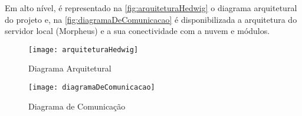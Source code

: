 Em alto nível, é representado na \autoref{fig:arquiteturaHedwig} o diagrama arquitetural do projeto e, na \autoref{fig:diagramaDeComunicacao} é disponibilizada a arquitetura do servidor local (Morpheus) e a sua conectividade com a nuvem e módulos.

\begin{figure}[htb]
	\caption{\label{fig:arquiteturaHedwig}Diagrama Arquitetural}
	\begin{center}
	    \texttt{[image: arquiteturaHedwig]}
	\end{center}
\end{figure}

\begin{figure}[htb]
	\caption{\label{fig:diagramaDeComunicacao}Diagrama de Comunicação}
	\begin{center}
	    \texttt{[image: diagramaDeComunicacao]}
	\end{center}
\end{figure}